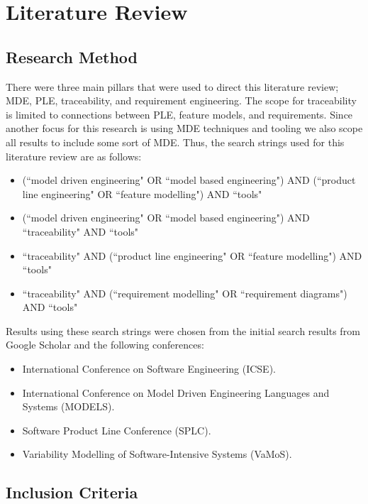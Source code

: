 \chapter{Literature Review}

\section{Research Method}
There were three main pillars that were used to direct this literature review; \ac{MDE}, \ac{PLE}, traceability, and requirement engineering. The scope for traceability is limited to connections between \ac{PLE}, feature models, and requirements. Since another focus for this research is using \ac{MDE} techniques and tooling we also scope all results to include some sort of \ac{MDE}. Thus, the search strings used for this literature review are as follows:
\begin{itemize}
	\item (``model driven engineering" OR ``model based engineering") AND (``product line engineering" OR ``feature modelling") AND ``tools"
	\item (``model driven engineering" OR ``model based engineering") AND ``traceability" AND ``tools"
	\item ``traceability" AND (``product line engineering" OR ``feature modelling") AND ``tools"
	\item ``traceability" AND (``requirement modelling" OR ``requirement diagrams") AND ``tools"
\end{itemize}

Results using these search strings were chosen from the initial search results from Google Scholar and the following conferences:
\begin{itemize}
	\item International Conference on Software Engineering (ICSE). 
	\item International Conference on Model Driven Engineering Languages and Systems (MODELS). 
	\item Software Product Line Conference (SPLC).
	\item Variability Modelling of Software-Intensive Systems (VaMoS).
\end{itemize}

\section{Inclusion Criteria}

